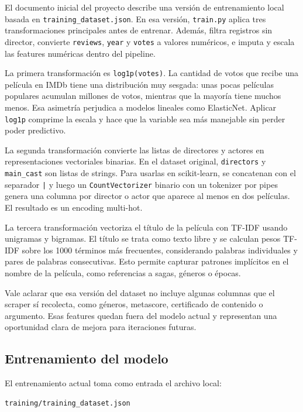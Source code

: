 \documentclass[letterpaper,12pt]{article}
\begin{document}
El documento inicial del proyecto describe una versión de entrenamiento local basada en \texttt{training\_dataset.json}. En esa versión, \texttt{train.py} aplica tres transformaciones principales antes de entrenar. Además, filtra registros sin director, convierte \texttt{reviews}, \texttt{year} y \texttt{votes} a valores numéricos, e imputa y escala las features numéricas dentro del pipeline.

La primera transformación es \texttt{log1p(votes)}. La cantidad de votos que recibe una película en IMDb tiene una distribución muy sesgada: unas pocas películas populares acumulan millones de votos, mientras que la mayoría tiene muchos menos. Esa asimetría perjudica a modelos lineales como ElasticNet. Aplicar \texttt{log1p} comprime la escala y hace que la variable sea más manejable sin perder poder predictivo.

La segunda transformación convierte las listas de directores y actores en representaciones vectoriales binarias. En el dataset original, \texttt{directors} y \texttt{main\_cast} son listas de strings. Para usarlas en scikit-learn, se concatenan con el separador \texttt{|} y luego un \texttt{CountVectorizer} binario con un tokenizer por pipes genera una columna por director o actor que aparece al menos en dos películas. El resultado es un encoding multi-hot.

La tercera transformación vectoriza el título de la película con TF-IDF usando unigramas y bigramas. El título se trata como texto libre y se calculan pesos TF-IDF sobre los 1000 términos más frecuentes, considerando palabras individuales y pares de palabras consecutivas. Esto permite capturar patrones implícitos en el nombre de la película, como referencias a sagas, géneros o épocas.

Vale aclarar que esa versión del dataset no incluye algunas columnas que el scraper sí recolecta, como géneros, metascore, certificado de contenido o argumento. Esas features quedan fuera del modelo actual y representan una oportunidad clara de mejora para iteraciones futuras.

\subsection{Entrenamiento del modelo}

El entrenamiento actual toma como entrada el archivo local:

\begin{lstlisting}
training/training_dataset.json
\end{lstlisting}
\end{document}
